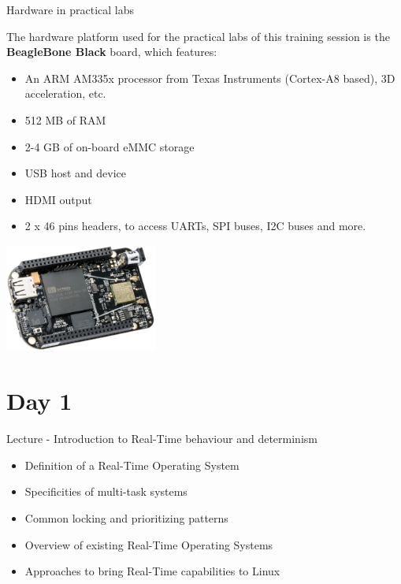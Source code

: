 \documentclass[a4paper,12pt,obeyspaces,spaces,hyphens]{article}
\begin{document}
\feagendatwocolumn
{Hardware in practical labs}
{
  The hardware platform used for the practical labs of this training
  session is the {\bf BeagleBone Black} board, which features:

  \begin{itemize}
  \item An ARM AM335x processor from Texas Instruments (Cortex-A8
    based), 3D acceleration, etc.
  \item 512 MB of RAM
  \item 2-4 GB of on-board eMMC storage
  \item USB host and device
  \item HDMI output
  \item 2 x 46 pins headers, to access UARTs, SPI buses, I2C buses
    and more.
  \end{itemize}
}
{}
{
  \begin{center}
  \includegraphics[width=5cm]{../slides/beagleboneblack-board/beagleboneblack.png}
  \end{center}
}

\section{Day 1}

\feagendaonecolumn
{Lecture - Introduction to Real-Time behaviour and determinism}
{
  \begin{itemize}
  \item Definition of a Real-Time Operating System
  \item Specificities of multi-task systems
  \item Common locking and prioritizing patterns
  \item Overview of existing Real-Time Operating Systems
  \item Approaches to bring Real-Time capabilities to Linux
  \end{itemize}
}
\end{document}
